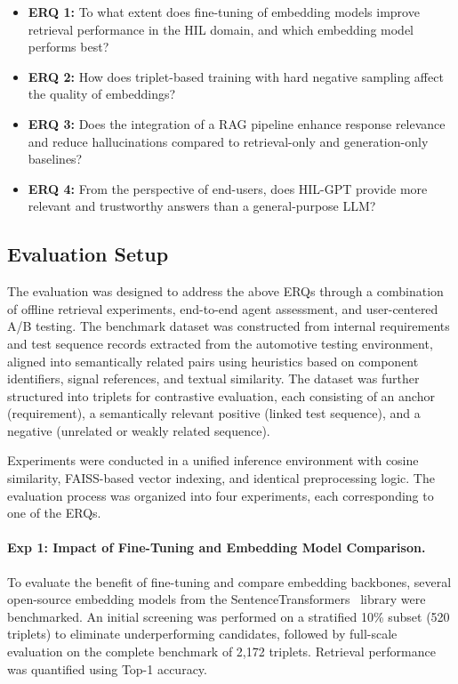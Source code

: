 \documentclass[a4paper,fleqn]{cas-dc}
\renewcommand{\textit}[1]{#1}
\begin{document}
\begin{itemize}
    \item \textit{\textbf{ERQ 1:}} To what extent does fine-tuning of embedding models improve retrieval performance in the HIL domain, and which embedding model performs best?
    \item \textit{\textbf{ERQ 2:}} How does triplet-based training with hard negative sampling affect the quality of embeddings?
    \item \textit{\textbf{ERQ 3:}} Does the integration of a RAG pipeline enhance response relevance and reduce hallucinations compared to retrieval-only and generation-only baselines?
    \item \textit{\textbf{ERQ 4:}} From the perspective of end-users, does HIL-GPT provide more relevant and trustworthy answers than a general-purpose LLM?    
\end{itemize}

\subsection{Evaluation Setup}
\label{sec:evaluation-setup}

The evaluation was designed to address the above ERQs through a combination of offline retrieval experiments, end-to-end agent assessment, and user-centered A/B testing. The benchmark dataset was constructed from internal requirements and test sequence records extracted from the automotive testing environment, aligned into semantically related pairs using heuristics based on component identifiers, signal references, and textual similarity. The dataset was further structured into triplets for contrastive evaluation, each consisting of an \textit{anchor} (requirement), a semantically relevant \textit{positive} (linked test sequence), and a \textit{negative} (unrelated or weakly related sequence).

Experiments were conducted in a unified inference environment with cosine similarity, FAISS-based vector indexing, and identical preprocessing logic. The evaluation process was organized into four experiments, each corresponding to one of the ERQs.

\paragraph{Exp 1: Impact of Fine-Tuning and Embedding Model Comparison.} 
To evaluate the benefit of fine-tuning and compare embedding backbones, several open-source embedding models from the SentenceTransformers~\cite{reimers-2019-sentence-bert} library were benchmarked. An initial screening was performed on a stratified 10\% subset (520 triplets) to eliminate underperforming candidates, followed by full-scale evaluation on the complete benchmark of 2,172 triplets. Retrieval performance was quantified using Top-1 accuracy.
\end{document}
